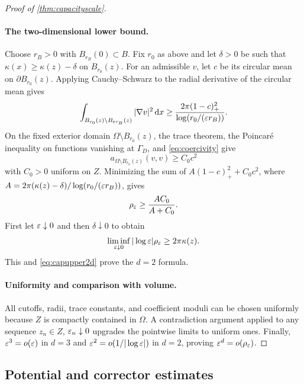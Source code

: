 \begin{proof}[Proof of \cref{thm:capacityscale}]
\paragraph{The two-dimensional lower bound.}
Choose $r_B>0$ with $B_{r_B}(0)\subset B$.  Fix $r_0$ as above and let
$\delta>0$ be such that
$\kappa(x)\ge\kappa(z)-\delta$ on $B_{r_0}(z)$.  For an admissible $v$, let
$c$ be its circular mean on $\partial B_{r_0}(z)$.  Applying Cauchy--Schwarz
to the radial derivative of the circular mean gives
\begin{equation}
 \int_{B_{r_0}(z)\setminus B_{\varepsilon r_B}(z)}|\nabla v|^2\,\mathrm dx
 \ge\frac{2\pi(1-c)_+^2}{\log(r_0/(\varepsilon r_B))}.
 \label{eq:annuluslower}
\end{equation}
On the fixed exterior domain $\Omega\setminus B_{r_0}(z)$, the trace theorem,
the Poincar\'e inequality on functions vanishing at $\Gamma_D$, and
\cref{eq:coercivity} give
\begin{equation}
 a_{\Omega\setminus B_{r_0}(z)}(v,v)\ge C_0c^2
 \label{eq:outerresistance}
\end{equation}
with $C_0>0$ uniform on $Z$.  Minimizing the sum of
$A(1-c)_+^2+C_0c^2$, where
$A=2\pi(\kappa(z)-\delta)/\log(r_0/(\varepsilon r_B))$, gives
\begin{equation}
 \rho_\varepsilon\ge\frac{AC_0}{A+C_0}.
\end{equation}
First let $\varepsilon\downarrow0$ and then $\delta\downarrow0$ to obtain
\begin{equation}
 \liminf_{\varepsilon\downarrow0}|\log\varepsilon|\rho_\varepsilon
 \ge2\pi\kappa(z).
 \label{eq:caplower2d}
\end{equation}
This and \cref{eq:capupper2d} prove the $d=2$ formula.

\paragraph{Uniformity and comparison with volume.}
All cutoffs, radii, trace constants, and coefficient moduli can be chosen
uniformly because $Z$ is compactly contained in $\Omega$.  A contradiction
argument applied to any sequence $z_n\in Z$, $\varepsilon_n\downarrow0$ upgrades the
pointwise limits to uniform ones.  Finally,
$\varepsilon^3=o(\varepsilon)$ in $d=3$ and
$\varepsilon^2=o(1/|\log\varepsilon|)$ in $d=2$, proving
$\varepsilon^d=o(\rho_\varepsilon)$.
\end{proof}

\subsection{Potential and corrector estimates}


